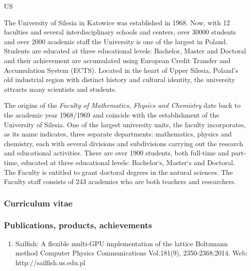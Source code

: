 \begin{sitedescription}{US}

The University of Silesia in Katowice was established in 1968. Now,
with 12 faculties and several interdisciplinary schools and centers,
over 30000 students and over 2000 academic staff the University is one
of the largest in Poland. Students are educated at three educational
levels: Bachelor, Master and Doctoral and their achievement are
accumulated using European Credit Transfer and Accumulation System
(ECTS). Located in the heart of Upper Silesia, Poland’s old industrial
region with distinct history and cultural identity, the university
attracts many scientists and students.

The origins of the {\em Faculty of Mathematics, Fhysics and Chemistry} date
back to the academic year 1968/1969 and coincide with the
establishment of the University of Silesia. One of the largest
university units, the faculty incorporates, as its name indicates,
three separate departments: mathematics, physics and chemistry, each
with several divisions and subdivisions carrying out the research and
educational activities. There are over 1900 students, both full-time
and part-time, educated at three educational levels: Bachelor`s,
Master`s and Doctoral. The Faculty is entitled to grant doctoral
degrees in the natural sciences. The Faculty staff consists of 243
academics who are both teachers and researchers.

\subsubsection*{Curriculum vitae}



%
%

\subsubsection*{Publications, products, achievements}


\begin{enumerate}

\item Sailfish: A flexible multi-GPU implementation of the lattice Boltzmann method
 Computer Physics Communications Vol.181(9), 2350-2368;2014. Web: http://sailfish.us.edu.pl 


\end{enumerate}
\end{sitedescription}
